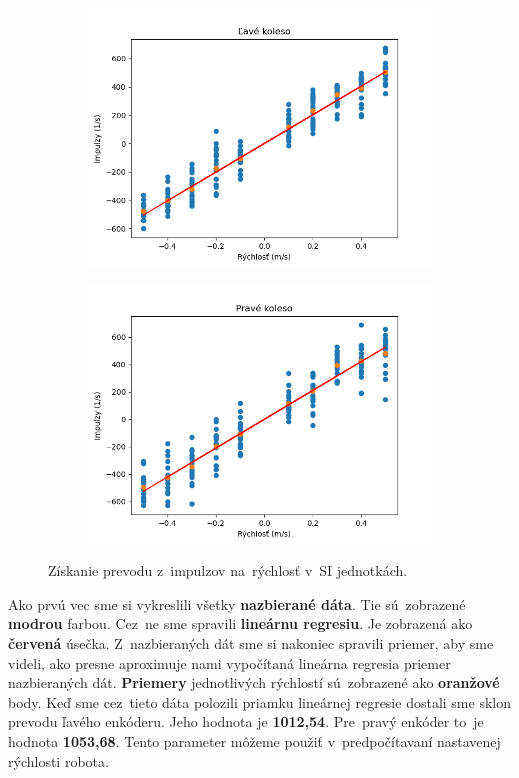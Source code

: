 \begin{figure}[!htbp]
	\begin{subfigure}{0.5\textwidth}
		\includegraphics[width=\textwidth]{img/lw_nf.png}
	\end{subfigure}
	\hfill
	\begin{subfigure}{0.5\textwidth}
		\includegraphics[width=\textwidth]{img/rw_nf.png}
	\end{subfigure}
	\caption{Získanie prevodu z~impulzov na~rýchlosť v~SI jednotkách.}
	\label{fig:rw_lw_nf}
\end{figure}

Ako prvú vec sme si vykreslili všetky \textbf{nazbierané dáta}. Tie sú~zobrazené \textbf{modrou} farbou. Cez~ne
sme spravili \textbf{lineárnu regresiu}. Je zobrazená ako \textbf{červená} úsečka. Z~nazbieraných dát sme si
nakoniec spravili priemer, aby sme videli, ako presne aproximuje nami vypočítaná lineárna regresia priemer
nazbieraných dát. \textbf{Priemery} jednotlivých rýchlostí sú~zobrazené ako \textbf{oranžové} body.
Keď sme cez~tieto dáta polozili priamku lineárnej regresie dostali sme sklon prevodu ľavého enkóderu. Jeho
hodnota je \textbf{1012,54}. Pre~pravý enkóder to~je hodnota \textbf{1053,68}. Tento parameter
môžeme použiť v~predpočítavaní nastavenej rýchlosti robota.

